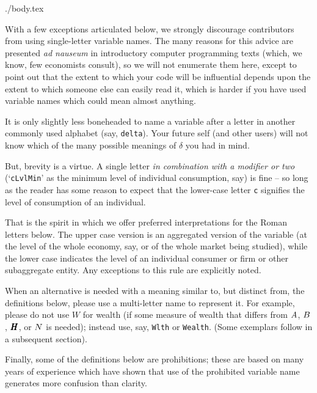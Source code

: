 \documentclass{econtex}
\begin{document}
\begin{verbatimwrite}{./body.tex}

With a few exceptions articulated below, we strongly discourage contributors from using single-letter variable names.  The many reasons for this advice are presented {\it ad nauseum} in introductory computer programming texts (which, we know, few economists consult), so we will not enumerate them here, except to point out that the extent to which your code will be influential depends upon the extent to which someone else can easily read it, which is harder if you have used variable names which could mean almost anything.

It is only slightly less boneheaded to name a variable after a letter in another commonly used alphabet (say, \texttt{delta}).  Your future self (and other users) will not know which of the many possible meanings of $\delta$ you had in mind.

But, brevity is a virtue.  A single letter {\it in combination with a modifier or two} (`\texttt{cLvlMin}' as the minimum level of individual consumption, say) is fine -- so long as the reader has some reason to expect that the lower-case letter \texttt{c} signifies the level of consumption of an individual.  

That is the spirit in which we offer preferred interpretations for the Roman letters below.  The upper case version is an aggregated version of the variable (at the level of the whole economy, say, or of the whole market being studied), while the lower case indicates the level of an individual consumer or firm or other subaggregate entity.  Any exceptions to this rule are explicitly noted.

When an alternative is needed with a meaning similar to, but distinct from, the definitions below, please use a multi-letter name to represent it.  For example, please do not use $W$ for wealth (if some measure of wealth that differs from $A$, $B$, $\pmb{H}$, or $N$ is needed); instead use, say, \texttt{Wlth} or \texttt{Wealth}.  (Some exemplars follow in a subsequent section).

Finally, some of the definitions below are prohibitions; these are based on many years of experience which have shown that use of the prohibited variable name generates more confusion than clarity.  
\pagebreak


\end{verbatimwrite}
\end{document}
